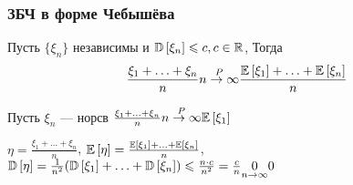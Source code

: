 \documentclass[a4paper, 10pt]{article}
\begin{document}
\subsubsection*{ЗБЧ в форме Чебышёва}
Пусть $\{\xi_n\}$ независимы и $\mathbb{D}\left[\xi_n\right]\leqslant c,c\in\mathbb{R}$, Тогда
\begin{equation*}
    \frac{\xi_1+\ldots+\xi_n}{n}\overset{P}{n\to\infty}\frac{\mathbb{E}\left[\xi_1\right]+\ldots+\mathbb{E}\left[\xi_n\right]}{n}
\end{equation*}

\comment Пусть $\xi_n$ — норсв $\frac{\xi_1+\ldots+\xi_n}{n}\overset{P}{n\to\infty}\mathbb{E}\left[\xi_1\right]$

\proof $\eta=\frac{\xi_1+\ldots+\xi_n}{n}$, $\mathbb{E}\left[\eta\right]=\frac{\mathbb{E}\left[\xi_1\right]+\ldots+\mathbb{E}\left[\xi_n\right]}{n}$, $\mathbb{D}\left[\eta\right]=\frac{1}{n^2}(\mathbb{D}\left[\xi_1\right]+\ldots+\mathbb{D}\left[\xi_n\right])\leqslant\frac{n\cdot c}{n^2}=\frac{c}{n}\underset{n\to\infty}{0}0$
\end{document}
